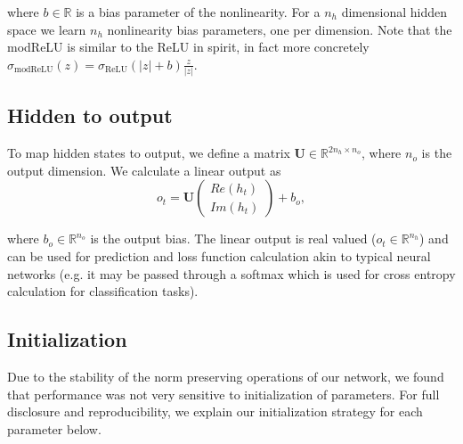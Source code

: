 \documentclass{article} %
\newcommand{\matr}[1]{\mathbf{#1}}
\newcommand\RR{\mathbb{R}}
\begin{document}
where $b \in \RR$ is a bias parameter of the nonlinearity. For a $n_h$ dimensional hidden space
we learn $n_h$ nonlinearity bias parameters, one per dimension. 
Note that the modReLU is similar to the ReLU in spirit, in fact more concretely
$\sigma_\mathrm{modReLU}(z) = \sigma_\mathrm{ReLU}(|z| + b) \frac{z}{|z|}$. 

\subsection{Hidden to output}

To map hidden states to output, we define a matrix $\matr{U} \in \RR^{2n_h \times n_o}$, 
where $n_o$ is the output dimension. We calculate a linear output as
\begin{equation} o_t = \matr{U} \begin{pmatrix} Re(h_t) \\ Im(h_t) \end{pmatrix} + b_o , \end{equation}

where $b_o \in \RR^{n_o}$ is the output bias. 
The linear output is real valued ($o_t \in \RR^{n_h}$) and can be used for prediction and loss function 
calculation akin to typical neural networks (e.g. it may be passed through a softmax which is used for 
cross entropy calculation for classification tasks).


\subsection{Initialization}

Due to the stability of the norm preserving operations of our network, we found that performance was
not very sensitive to initialization of parameters.
For full disclosure and reproducibility, we explain our initialization strategy for each parameter below.
\end{document}
